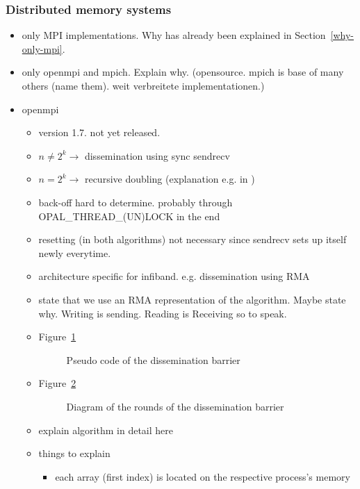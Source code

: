 \documentclass[a4paper, 10pt]{article}
\begin{document}
\subsubsection{Distributed memory systems}
\label{sssec:existing-currently-used-distributed}
\begin{itemize}
	\item only MPI implementations. Why has already been explained in Section~\ref{why-only-mpi}.
	\item only openmpi and mpich. Explain why. (opensource. mpich is base of many others (name them). weit verbreitete implementationen.)
	\item openmpi
		\begin{itemize}
			\item version 1.7. not yet released.
			\item $n \neq 2^k \rightarrow$ dissemination\cite{hensgen1988} using sync sendrecv
			\item $n = 2^k \rightarrow$ recursive doubling (explanation e.g. in \cite{hoefler2005})
			\item back-off hard to determine. probably through OPAL\_THREAD\_(UN)LOCK in the end
			\item resetting (in both algorithms) not necessary since sendrecv sets up itself newly everytime.
			\item architecture specific for infiband. e.g. dissemination using RMA \cite{hoefler2006a}
			\item state that we use an RMA representation of the algorithm. Maybe state why. Writing is sending. Reading is Receiving so to speak.
			\item Figure~\ref{fig:pseudo-code-dissemination}
				\begin{figure}[htbp]
					\centering
					
					\caption{Pseudo code of the dissemination barrier}
					\label{fig:pseudo-code-dissemination}
				\end{figure}
			\item Figure~\ref{fig:diagram-dissemination}
				\begin{figure}[htbp]
					\centering
					
					\caption{Diagram of the rounds of the dissemination barrier}
					\label{fig:diagram-dissemination}
				\end{figure}
			\item explain algorithm in detail here
			\item things to explain
				\begin{itemize}
					\item each array (first index) is located on the respective process's memory
				\end{itemize}


\end{itemize}
\end{itemize}
\end{document}
